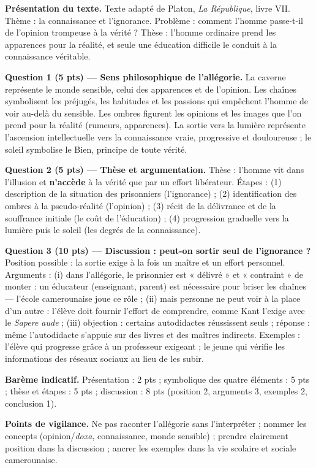 \documentclass[11pt]{article}
\newcommand{\cle}[1]{{\popxbold\color{popdark}#1}}
\begin{document}
\begin{corrige}
\textbf{Présentation du texte.} Texte adapté de Platon, \emph{La République}, livre VII. Thème : la connaissance et l'ignorance. Problème : comment l'homme passe-t-il de l'opinion trompeuse à la vérité ? Thèse : l'homme ordinaire prend les apparences pour la réalité, et seule une éducation difficile le conduit à la connaissance véritable.

\textbf{Question 1 (5 pts) — Sens philosophique de l'allégorie.} La \cle{caverne} représente le monde sensible, celui des apparences et de l'opinion. Les \cle{chaînes} symbolisent les préjugés, les habitudes et les passions qui empêchent l'homme de voir au-delà du sensible. Les \cle{ombres} figurent les opinions et les images que l'on prend pour la réalité (rumeurs, apparences). La \cle{sortie vers la lumière} représente l'ascension intellectuelle vers la connaissance vraie, progressive et douloureuse ; le soleil symbolise le Bien, principe de toute vérité.

\textbf{Question 2 (5 pts) — Thèse et argumentation.} Thèse : l'homme vit dans l'illusion et \textbf{n'accède} à la vérité que par un effort libérateur. Étapes : (1) description de la situation des prisonniers (l'ignorance) ; (2) identification des ombres à la pseudo-réalité (l'opinion) ; (3) récit de la délivrance et de la souffrance initiale (le coût de l'éducation) ; (4) progression graduelle vers la lumière puis le soleil (les degrés de la connaissance).

\textbf{Question 3 (10 pts) — Discussion : peut-on sortir seul de l'ignorance ?} Position possible : la sortie exige à la fois un maître et un effort personnel. Arguments : (i) dans l'allégorie, le prisonnier est « délivré » et « contraint » de monter : un éducateur (enseignant, parent) est nécessaire pour briser les chaînes — l'école camerounaise joue ce rôle ; (ii) mais personne ne peut voir à la place d'un autre : l'élève doit fournir l'effort de comprendre, comme Kant l'exige avec le \emph{Sapere aude} ; (iii) objection : certains autodidactes réussissent seuls ; réponse : même l'autodidacte s'appuie sur des livres et des maîtres indirects. Exemples : l'élève qui progresse grâce à un professeur exigeant ; le jeune qui vérifie les informations des réseaux sociaux au lieu de les subir.

\textbf{Barème indicatif.} Présentation : 2 pts ; symbolique des quatre éléments : 5 pts ; thèse et étapes : 5 pts ; discussion : 8 pts (position 2, arguments 3, exemples 2, conclusion 1).

\textbf{Points de vigilance.} Ne pas raconter l'allégorie sans l'interpréter ; nommer les concepts (opinion/\emph{doxa}, connaissance, monde sensible) ; prendre clairement position dans la discussion ; ancrer les exemples dans la vie scolaire et sociale camerounaise.
\end{corrige}
\end{document}
